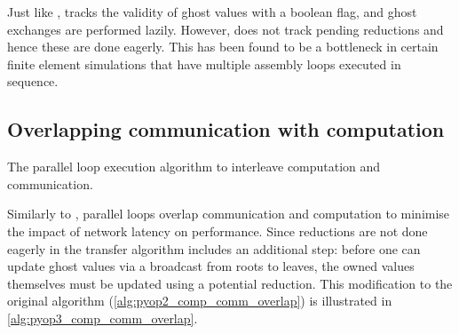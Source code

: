 \documentclass[thesis]{subfiles}
\begin{document}
\begin{pyopcompare}
  Just like ,  tracks the validity of ghost values with a boolean flag, and ghost exchanges are performed lazily.
  However,  does not track pending reductions and hence these are done eagerly.
  This has been found to be a bottleneck in certain finite element simulations that have multiple assembly loops executed in sequence.
\end{pyopcompare}

\subsection{Overlapping communication with computation}

\begin{algorithm}
  \caption{The  parallel loop execution algorithm to interleave computation and communication.}
  \begin{algorithmic}[1]
    \State {} 

     
      \State {}
    \EndFor

    \State {} 
    \State {} 

     
      \State {}
    \EndFor

    \State {} 

     
      \State {}
    \EndFor
  \end{algorithmic}
  \label{alg:pyop3_comp_comm_overlap}
\end{algorithm}

Similarly to ,  parallel loops overlap communication and computation to minimise the impact of network latency on performance.
Since reductions are not done eagerly in  the transfer algorithm includes an additional step: before one can update ghost values via a broadcast from roots to leaves, the owned values themselves must be updated using a potential reduction.
This modification to the original  algorithm (\cref{alg:pyop2_comp_comm_overlap}) is illustrated in \cref{alg:pyop3_comp_comm_overlap}.
\end{document}
